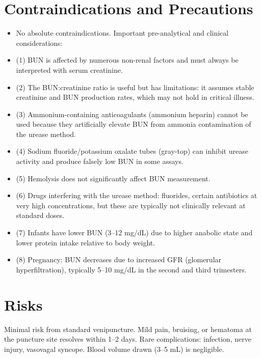 \section*{Contraindications and Precautions}
\begin{itemize}
  \item No absolute contraindications. Important pre-analytical and clinical considerations:
  \item (1) BUN is affected by numerous non-renal factors and must always be interpreted with serum creatinine.
  \item (2) The BUN:creatinine ratio is useful but has limitations: it assumes stable creatinine and BUN production rates, which may not hold in critical illness.
  \item (3) Ammonium-containing anticoagulants (ammonium heparin) cannot be used because they artificially elevate BUN from ammonia contamination of the urease method.
  \item (4) Sodium fluoride/potassium oxalate tubes (gray-top) can inhibit urease activity and produce falsely low BUN in some assays.
  \item (5) Hemolysis does not significantly affect BUN measurement.
  \item (6) Drugs interfering with the urease method: fluorides, certain antibiotics at very high concentrations, but these are typically not clinically relevant at standard doses.
  \item (7) Infants have lower BUN (3--12 mg/dL) due to higher anabolic state and lower protein intake relative to body weight.
  \item (8) Pregnancy: BUN decreases due to increased GFR (glomerular hyperfiltration), typically 5--10 mg/dL in the second and third trimesters.
\end{itemize}
\section*{Risks}
Minimal risk from standard venipuncture. Mild pain, bruising, or hematoma at the puncture site resolves within 1--2 days. Rare complications: infection, nerve injury, vasovagal syncope. Blood volume drawn (3--5 mL) is negligible.

